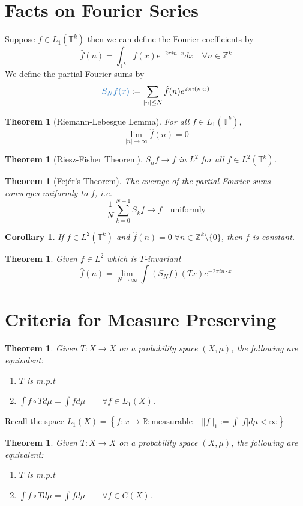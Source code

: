 \documentclass[11pt]{article}
\newcommand{\defeq}{:=}
\newcommand{\abs}[1]{\left|#1\right|}
\newcommand{\norm}[1]{\left|\left|#1\right|\right|}
\newcommand{\ktor}{\mathbb{T}^k}
\newcommand{\R}{\mathbb{R}}
\newcommand{\Z}{\mathbb{Z}}
\newcommand{\mdf}[1]{{\color{RoyalBlue} #1}}
\newtheorem{theorem}[prop]{Theorem}
\newtheorem{cor}[prop]{Corollary}
\begin{document}
\section{Facts on Fourier Series}
Suppose $f\in L_1(\ktor)$ then we can define the \mdf{Fourier coefficients} by
$$\hat{f}(n)=\int_{\ktor}f(x)e^{-2\pi in\cdot x}dx\quad\forall n\in\Z^k$$
We define the \mdf{partial Fourier sums} by
\[
	\mdf{S_Nf(x)}\defeq\sum_{\abs{n}\leq N}\hat{f}(n)e^{2\pi i (n\cdot x)}
\]

\begin{theorem}[Riemann-Lebesgue Lemma]
	For all $f\in L_1(\ktor)$, $$\lim_{\abs{n}\to\infty}\hat{f}(n)=0$$
\end{theorem}
\begin{theorem}[Riesz-Fisher Theorem]
$S_nf\to f$ in $L^2$ for all $f\in L^2(\ktor)$.
\end{theorem}
\begin{theorem}[Fej\'er's Theorem]
The average of the partial Fourier sums converges uniformly to $f$, i.e.
$$\frac{1}{N}\sum_{k=0}^{N-1}S_kf\to f\quad\text{uniformly}$$
\end{theorem}
\begin{cor}
If $f\in L^2(\ktor)$ and $\hat{f}(n)=0\;\forall n\in\Z^k\setminus\{0\}$, then $f$ is constant.
\end{cor}
\begin{theorem}
Given $f\in L^2$ which is $T$-invariant
$$\hat{f}(n)=\lim_{N\to\infty}\int (S_N f)(Tx)e^{-2\pi i n\cdot x}$$
\end{theorem}
\section{Criteria for Measure Preserving}
\begin{theorem}
Given $T:X\to X$ on a probability space $(X,\mu)$, the following are equivalent:
\begin{enumerate}
	\item $T$ is m.p.t
	\item $\int f\circ T d\mu = \int f d\mu \quad\quad \forall f\in L_1(X)$.\end{enumerate}
\end{theorem}
Recall the space $L_1(X)=\left\{ f:x\to\R : \text{measurable}\quad \norm{f}_1 \defeq\int \abs{f} d\mu < \infty \right\}$

\begin{theorem}
Given $T:X\to X$ on a probability space $(X,\mu)$, the following are equivalent:
\begin{enumerate}
	\item $T$ is m.p.t
	\item $\int f\circ T d\mu = \int f d\mu \quad\quad \forall f\in C(X)$.
\end{enumerate}
\end{theorem}
\end{document}
